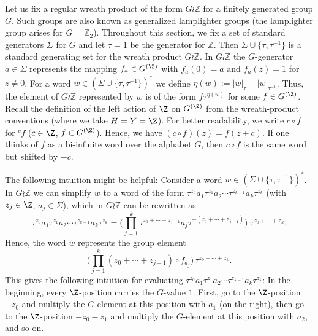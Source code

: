 Let us fix a regular wreath product of the form $G \wr \mathbb{Z}$ for a finitely generated
group $G$. Such groups are also known as generalized lamplighter groups (the lamplighter group arises
for $G = \mathbb{Z}_2$). Throughout this section, we fix a set of standard generators $\Sigma$ for $G$ and let $\tau = 1$ be the generator for $\mathbb{Z}$. 
Then $\Sigma \cup \{\tau,\tau^{-1}\}$ is a standard generating set for the wreath product $G \wr \mathbb{Z}$.
In $G \wr \mathbb{Z}$ the $G$-generator $a \in \Sigma$ represents the mapping $f_{a} \in G^{(\Z)}$ with $f_{a}(0) = a$ and 
$f_{a}(z) = 1$ for $z \neq 0$. 
For a word $w \in (\Sigma \cup \{\tau,\tau^{-1}\})^*$ we define $\eta(w) :=  |w|_\tau-|w|_{\tau^{-1}}$. Thus, the element of $G \wr \mathbb{Z}$ represented by
$w$ is of the form $f  \tau^{\eta(w)}$ for some $f \in G^{(\Z)}$.
Recall the definition of the left action of $\Z$ on $G^{(\Z)}$ from the wreath-product conventions (where we take $H = Y = \Z$).
For better readability, we write $c \circ f$ for ${}^c \! f$ ($c \in \Z$, $f \in G^{(\Z)}$).
Hence, we have $(c \circ f)(z) = f(z+c)$. If one thinks of $f$ as a bi-infinite word over the alphabet $G$,
then $c \circ f$ is the same word but shifted by $-c$.

The following intuition might be helpful: Consider a word $w \in ( \Sigma \cup \{\tau, \tau^{-1} \})^*$. In 
$G \wr \mathbb{Z}$ we can simplify $w$ to a word of the form
$\tau^{z_0} a_{1} \tau^{z_1} a_{2} \cdots \tau^{z_{k-1}} a_{k} \tau^{z_k}$ (with $z_j \in \Z$, $a_j \in \Sigma$),
which in $G \wr \mathbb{Z}$ can be rewritten
as
\[
\tau^{z_0} a_{1} \tau^{z_1} a_{2} \cdots \tau^{z_{k-1}} a_{k} \tau^{z_k} = \big(\prod_{j=1}^k \tau^{z_0 + \cdots+ z_{j-1}} a_{j} \tau^{-(z_0 + \cdots +z_{j-1})}\big) \; \tau^{z_0 + \cdots +z_k}.
\]  
Hence, the word $w$ represents the group element 
\[
\big(\prod_{j=1}^k (z_0 + \cdots+ z_{j-1}) \circ f_{a_j} \big)\, \tau^{z_0 + \cdots +z_k} .
\]
This gives the following intuition for evaluating $\tau^{z_0} a_{1} \tau^{z_1} a_{2} \cdots \tau^{z_{k-1}} a_{k} \tau^{z_k}$:
In the beginning, every $\Z$-position carries the $G$-value $1$. First, 
go to the $\Z$-position $-z_0$ and multiply the $G$-element at this position with $a_1$ (on the right), then 
go to the $\Z$-position $-z_0-z_1$ and multiply the $G$-element at this position with $a_2$, and so on.  

